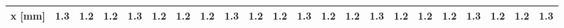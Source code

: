 \begin{tabular}[t]{
  lSSSSSSSSSSSSSSSSSSSSS
}\toprule
x [mm] & 1.3 & 1.2 & 1.2 & 1.3 & 1.2 & 1.2 & 1.2 & 1.3 & 1.2 & 1.2 & 1.3 & 1.2 & 1.2 & 1.3 & 1.2 & 1.2 & 1.2 & 1.3 & 1.2 & 1.2 & 1.3 \\\bottomrule
\end{tabular}
